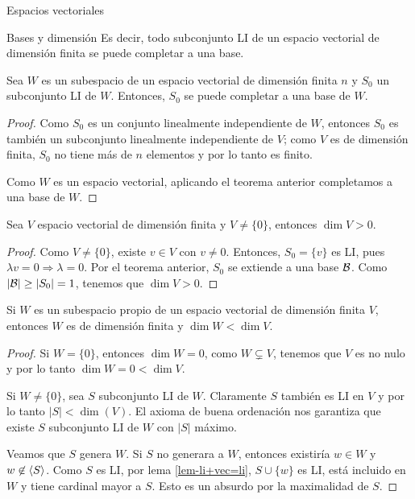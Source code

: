 \begin{chapter}{Espacios vectoriales}
\begin{section}{Bases y dimensi\'on}
Es decir, todo subconjunto LI de un espacio vectorial de dimensión finita se puede completar a una base.  

    \begin{corolario}
        Sea $W$ es un subespacio de un espacio vectorial de dimensión finita $n$ y $S_0$ un subconjunto LI de $W$. Entonces, $S_0$ se puede completar a una base de $W$. 
    \end{corolario}
    \begin{proof}
        Como $S_0$ es un conjunto linealmente independiente de $W$, entonces $S_0$ es también un subconjunto linealmente independiente de $V$; como $V$ es de dimensión finita, $S_0$ no tiene más de $n$ elementos y por lo tanto es finito.
        
        Como $W$ es un espacio vectorial, aplicando el teorema anterior completamos a una base de $W$. 
    \end{proof}

    \begin{corolario}
        Sea $V$ espacio vectorial de dimensión finita y $V \ne \{0\}$, entonces $\dim V >0$.
    \end{corolario}
    \begin{proof}
        Como $V \ne \{0\}$,  existe $v \in V$ con $v \ne 0$. Entonces, $S_0 = \{v\}$ es LI, pues $\lambda v =0 \Rightarrow \lambda =0$. Por el teorema anterior, $S_0$ se extiende a una base $\mathcal{B}$. Como $|\mathcal{B}| \ge |S_0| =1$, tenemos que $\dim V >0$.    
    \end{proof}
    
    \begin{corolario}\label{dimw-menor-dimv}
        Si $W$ es un subespacio propio de un espacio vectorial de dimensión finita $V$, entonces $W$ es de dimensión finita y  $\dim W < \dim V$.
    \end{corolario}
    \begin{proof} Si $W = \{0\}$, entonces $\dim W = 0$,  como $W \subsetneq V$,  tenemos que $V$  es no nulo y por lo tanto $\dim W = 0 < \dim V$. 
        

        Si  $W \ne \{0\}$,  sea $S$ subconjunto LI de $W$. Claramente $S$ también es LI en $V$ y por lo tanto $|S| < \dim(V)$. El axioma de buena ordenación nos garantiza que existe  $S$ subconjunto LI de $W$ con $|S|$ máximo. 
        
        Veamos que $S$ genera $W$. Si $S$ no generara a $W$,  entonces existiría $w \in W$ y $w\not\in \langle S\rangle$. Como $S$  es LI,  por lema \ref{lem-li+vec=li}, $S \cup \{w\}$ es LI,  está incluido en $W$ y tiene cardinal mayor a $S$. Esto es un absurdo por la maximalidad de $S$.
        

\end{proof}
\end{section}
\end{chapter}
